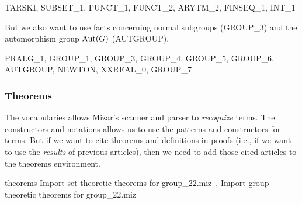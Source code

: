 \nwenddocs{}\endmoddef\nwstartdeflinemarkup{}\nwenddeflinemarkup
TARSKI, SUBSET_1, FUNCT_1, FUNCT_2, ARYTM_2, FINSEQ_1, INT_1
\nwendcode{}\nwdocspar

But we also want to use facts concerning normal subgroups ({\Tt{}GROUP{\_}3\nwendquote})
and the automorphism group $\operatorname{Aut}(G)$ ({\Tt{}AUTGROUP\nwendquote}).

\nwenddocs{}\endmoddef\nwstartdeflinemarkup{}\nwenddeflinemarkup
PRALG_1, GROUP_1, GROUP_3, GROUP_4, GROUP_5, GROUP_6, AUTGROUP, NEWTON,
XXREAL_0, GROUP_7
\nwendcode{}\nwdocspar

\subsubsection{Theorems}
The {\Tt{}vocabularies\nwendquote} allows Mizar's scanner and parser to
\emph{recognize} terms. The {\Tt{}constructors\nwendquote} and {\Tt{}notations\nwendquote} allows us
to use the patterns and constructors for terms. But if we want to cite
theorems and definitions in proofs (i.e., if we want to use the
\emph{results} of previous articles), then we need to add those cited
articles to the {\Tt{}theorems\nwendquote} environment.

\nwenddocs{}\endmoddef\nwstartdeflinemarkup{}\nwenddeflinemarkup
theorems
  \LA{}Import set-theoretic theorems for \code{}group{\_}22.miz\edoc{}~{\nwtagstyle{}}\RA{},
  \LA{}Import group-theoretic theorems for \code{}group{\_}22.miz\edoc{}~{\nwtagstyle{}}\RA{}
\nwendcode{}\nwdocspar

